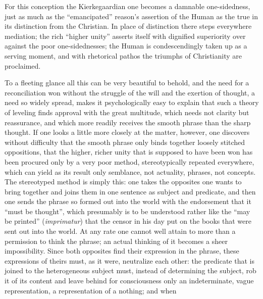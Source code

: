 \documentclass[12pt,a4paper,openany]{book}
\newcommand{\opage}[1]{\marginnote{\footnotesize\textit{[#1]}}}
\begin{document}
For this conception the Kierkegaardian one becomes a damnable
one-sidedness, just as much as the ``emancipated''
reason's assertion of the Human as the true in its
distinction from the Christian. In place of distinction there steps
everywhere mediation; the rich ``higher unity'' asserts itself with
dignified superiority over against the poor one-sidednesses;
the Human is condescendingly taken up as a serving moment,
and with rhetorical pathos the triumphs of Christianity are proclaimed.

To a fleeting glance all this can be very beautiful to
behold, and the need for a reconciliation won without the struggle of the will
and the exertion of thought, a need so widely spread, makes
it psychologically easy to explain that such a theory of leveling
finds approval with the great multitude, which needs not
clarity but reassurance, and which more readily receives the
smooth phrase than the sharp thought. If one looks a little more closely
at the matter, however, one discovers without difficulty that the
\opage{440}smooth phrase only binds together loosely stitched oppositions,
that the higher, richer unity that is supposed to have been won
has been procured only by a very poor method, stereotypically
repeated everywhere, which can yield as its result only semblance, not
actuality, phrases, not concepts. The stereotyped method
is simply this: one takes the opposites one wants
to bring together and joins them in one sentence as subject
and predicate, and then one sends the phrase so formed
out into the world with the endorsement that it ``must be thought'', which
presumably is to be understood rather like the ``may be printed''
(\textit{imprimatur}) that the censor in his day put on the books that
were sent out into the world. At any rate one cannot well attain to more than a permission to think
the phrase; an actual thinking of
it becomes a sheer impossibility. Since both opposites
find their expression in the phrase, these expressions of theirs must, as it were,
neutralize each other: the predicate that is joined to the heterogeneous
subject must, instead of determining the subject, rob it of
its content and leave behind for consciousness only an indeterminate, vague representation,
a representation of a nothing; and when
\end{document}
